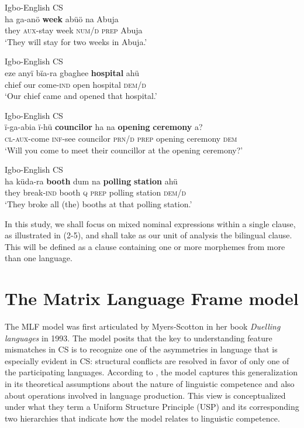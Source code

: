 \documentclass[output=paper]{langsci/langscibook}
\begin{document}
\ea\label{ex:ihemere:2}
{Igbo-English \textsc{CS}}\\
\gll ha    ga-anö     \textbf{week}  abüö  na  Abuja\\
     they  \textsc{aux}-stay  week  \textsc{num/d}  \textsc{prep} Abuja\\
\glt ‘They will stay for two weeks in Abuja.’
\z

\ea\label{ex:ihemere:3}
{Igbo-English \textsc{CS}}\\
\gll   eze  anyï  bïa-ra        gbaghee  \textbf{hospital}  ahü  \\
       chief   our  come-\textsc{ind}  open        hospital  \textsc{dem/d}\\
\glt   ‘Our chief came and opened that hospital.’
\z

\ea\label{ex:ihemere:4}
{Igbo-English \textsc{CS}}\\
\gll   ï-ga-abia  ï-hü  \textbf{councilor}  ha  na  \textbf{opening} \textbf{ceremony} a?\\
       \textsc{cl-aux}-come  \textsc{inf}-see  councilor  \textsc{prn/d}  \textsc{prep}  opening ceremony \textsc{dem}\\
\glt   ‘Will you come to meet their councillor at the opening ceremony?’
\z

\ea\label{ex:ihemere:5}
{Igbo-English \textsc{CS}}\\
\gll ha    küda-ra     \textbf{booth} dum   na    \textbf{polling} \textbf{station} ahü\\
     they break-\textsc{ind}  booth  \textsc{q}  \textsc{prep}  polling station   \textsc{dem/d}\\
\glt ‘They broke all (the) booths at that polling station.’   
\z

In this study, we shall focus on mixed nominal expressions within a single clause, as illustrated in (2-5), and shall take as our unit of analysis the bilingual clause. This will be defined as a clause containing one or more morphemes from more than one language.

\section{The Matrix Language Frame model}\label{sec:ihemere:3}

The MLF model was first articulated by Myers-Scotton in her book \textit{Duelling languages} in 1993. The model posits that the key to understanding feature mismatches in CS is to recognize one of the asymmetries in language that is especially evident in CS: structural conflicts are resolved in favor of only one of the participating languages. According to \citet[72]{JakeEtAl2002}, the model captures this generalization in its theoretical assumptions about the nature of linguistic competence and also about operations involved in language production. This view is conceptualized under what they term a Uniform Structure Principle (USP) and its corresponding two hierarchies that indicate how the model relates to linguistic competence. 
\end{document}
